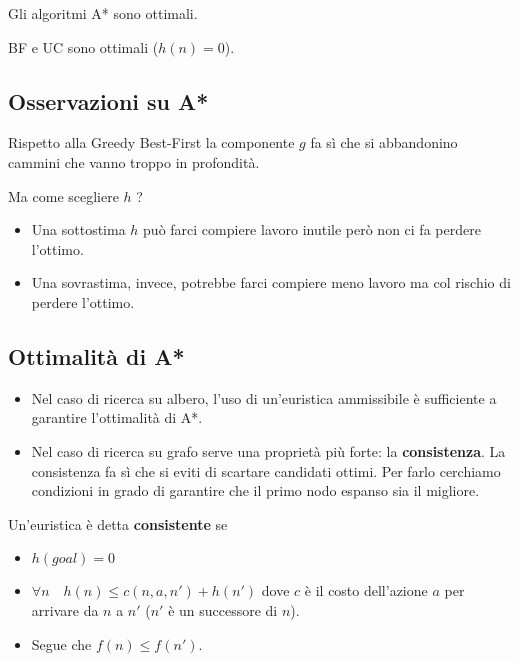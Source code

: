\begin{theorem}
	Gli algoritmi A* sono ottimali.
\end{theorem}

\begin{corollary}
	BF e UC sono ottimali ($h(n) = 0$).
\end{corollary}

\subsection{Osservazioni su A*}
Rispetto alla Greedy Best-First la componente $g$ fa s\`i che si abbandonino cammini che
vanno troppo in profondit\`a.

Ma come scegliere $h$ ?
\begin{itemize}
	\item Una sottostima $h$ pu\`o farci compiere lavoro inutile per\`o non ci fa perdere
	      l'ottimo.
	\item Una sovrastima, invece, potrebbe farci compiere meno lavoro ma col rischio di perdere
	      l'ottimo.
\end{itemize}

\subsection{Ottimalit\`a di A*}
\begin{itemize}
	\item Nel caso di ricerca su albero, l'uso di un'euristica ammissibile \`e sufficiente a
	      garantire l'ottimalit\`a di A*.
	\item Nel caso di ricerca su grafo serve una propriet\`a pi\`u forte: la
	      \textbf{consistenza}. La consistenza fa s\`i che si eviti di scartare candidati
	      ottimi. Per farlo cerchiamo condizioni in grado di garantire che il primo nodo
	      espanso sia il migliore.
\end{itemize}

\begin{definition}
	Un'euristica \`e detta \textbf{consistente} se
	\begin{itemize}
		\item $h(goal) = 0$
		\item $\forall n \quad h(n) \leq c(n, a, n') + h(n')$ dove $c$ \`e il costo
		      dell'azione $a$ per arrivare da $n$ a $n'$ ($n'$ \`e un successore di $n$).
		\item Segue che $f(n) \leq f(n')$.
	\end{itemize}
\end{definition}

